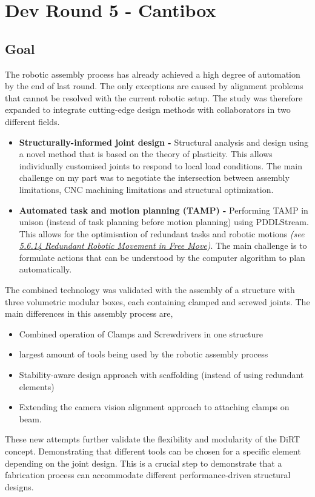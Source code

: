 \documentclass[11pt]{book}
\begin{document}
\vspace{1\baselineskip}
\section{Dev Round 5 - Cantibox}

\subsection{Goal}

The robotic assembly process has already achieved a high degree of automation by the end of last round. The only exceptions are caused by alignment problems that cannot be resolved with the current robotic setup. The study was therefore expanded to integrate cutting-edge design methods with collaborators in two different fields. 

\begin{itemize}
	\item \textbf{Structurally-informed joint design -} Structural analysis and design using a novel method that is based on the theory of plasticity. This allows individually customised joints to respond to local load conditions. The main challenge on my part was to negotiate the intersection between assembly limitations, CNC machining limitations and structural optimization. 

	\item \textbf{Automated task and motion planning (TAMP) -} Performing TAMP in unison (instead of task planning before motion planning) using PDDLStream. This allows for the optimisation of redundant tasks and robotic motions \textit{(see \uline{5.6.14 Redundant Robotic Movement in Free Move})}. The main challenge is to formulate actions that can be understood by the computer algorithm to plan automatically. 

\end{itemize}
The combined technology was validated with the assembly of a structure with three volumetric modular boxes, each containing clamped and screwed joints. The main differences in this assembly process are,

\begin{itemize}
	\item Combined operation of Clamps and Screwdrivers in one structure

	\item largest amount of tools being used by the robotic assembly process

	\item Stability-aware design approach with scaffolding (instead of using redundant elements)

	\item  Extending the camera vision alignment approach to attaching clamps on beam.

\end{itemize}
These new attempts further validate the flexibility and modularity of the DiRT concept. Demonstrating that different tools can be chosen for a specific element depending on the joint design. This is a crucial step to demonstrate that a fabrication process can accommodate different performance-driven structural designs.  
\end{document}
